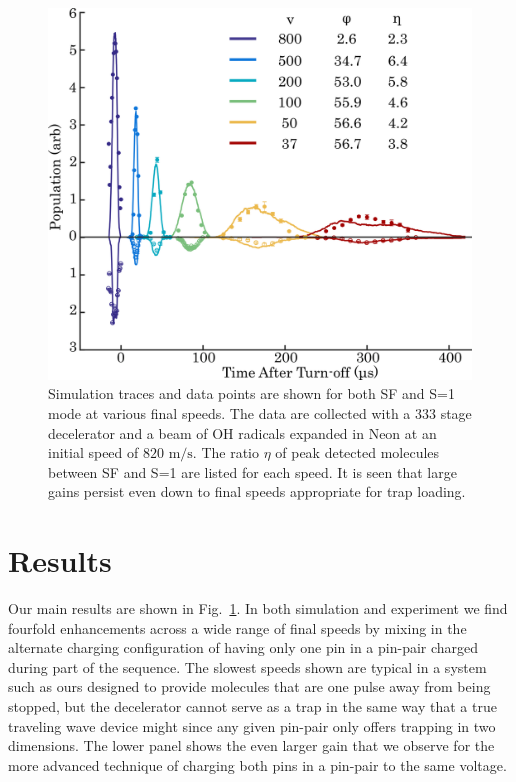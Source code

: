 \documentclass[%
 reprint,
 amsmath,amssymb,
 aps,
pra,
]{revtex4-1}
\begin{document}
\begin{figure}[t]
\includegraphics[width=\linewidth]{speedvary.png}%
\caption{
Simulation traces and data points are shown for both SF and S=1 mode at various final speeds. The data are collected with a $333$ stage decelerator and a beam of OH radicals expanded in Neon at an initial speed of $820\text{ m/s}$. The ratio $\eta$ of peak detected molecules between SF and S=1 are listed for each speed. It is seen that large gains persist even down to final speeds appropriate for trap loading.
}
\label{fig:speedvary}
\end{figure}


\section{Results}
Our main results are shown in Fig.~\ref{fig:speedvary}. In both simulation and experiment we find fourfold enhancements across a wide range of final speeds by mixing in the alternate charging configuration of having only one pin in a pin-pair charged during part of the sequence. The slowest speeds shown are typical in a system such as ours designed to provide molecules that are one pulse away from being stopped, but the decelerator cannot serve as a trap in the same way that a true traveling wave device might since any given pin-pair only offers trapping in two dimensions. The lower panel shows the even larger gain that we observe for the more advanced technique of charging both pins in a pin-pair to the same voltage.
\end{document}
